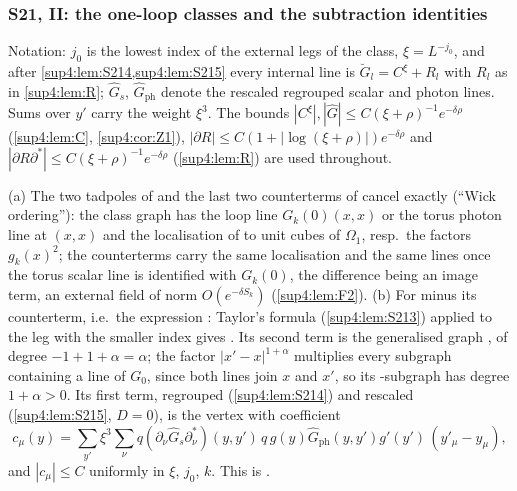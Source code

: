 
\subsubsection{S21, II: the one-loop classes and the subtraction identities}\label{sup4:ssec:S21b}

Notation: $j_0$ is the lowest index of the external legs of the class, $\xi=L^{-j_0}$, and after \cref{sup4:lem:S214,sup4:lem:S215} every internal line is $\breve G_l=C^\xi+R_l$ with $R_l$ as in \cref{sup4:lem:R}; $\hat G_s$, $\hat G_{\mathrm{ph}}$ denote the rescaled regrouped scalar and photon lines. Sums over $y'$ carry the weight $\xi^3$. The bounds $|C^\xi|,|\hat G|\le C(\xi+\rho)^{-1}e^{-\delta\rho}$ (\cref{sup4:lem:C}, \cref{sup4:cor:Z1}), $|\partial R|\le C(1+|\log(\xi+\rho)|)e^{-\delta\rho}$ and $|\partial R\partial^*|\le C(\xi+\rho)^{-1}e^{-\delta\rho}$ (\cref{sup4:lem:R}) are used throughout.

\begin{lemma}[{scalar self-energies with $D=-1$, \cite[(3.6)--(3.17)]{Ba3}}]\label{sup4:lem:S218}
\textup{(a)} The two tadpoles of \cite[(3.6)]{Ba3} and the last two counterterms of \cite[(3.7)]{Ba3} cancel exactly (``Wick ordering''): the class graph has the loop line $G_k(0)(x,x)$ or the torus photon line at $(x,x)$ and the localisation of \cite[(1.6)]{Ba3} to unit cubes of $\Omega_1$, resp.\ the factors $g_k(x)^2$; the counterterms \cite[(1.29)]{Ba3} carry the same localisation and the same lines once the torus scalar line is identified with $G_k(0)$, the difference being an image term, an external field of norm $O(e^{-\delta S_k})$ (\cref{sup4:lem:F2}). \textup{(b)} For \cite[(3.8)]{Ba3} minus its counterterm, i.e.\ the expression \cite[(3.9)]{Ba3}: Taylor's formula (\cref{sup4:lem:S213}) applied to the leg with the smaller index \cite[p.~435]{Ba3} gives \cite[(3.11)]{Ba3}. Its second term is the generalised graph \cite[(3.12)]{Ba3}, of degree $-1+1+\alpha=\alpha$; the factor $|x'-x|^{1+\alpha}$ multiplies every subgraph containing a line of $G_0$, since both lines join $x$ and $x'$, so its \cite[(2.4)]{Ba3}-subgraph has degree $1+\alpha>0$. Its first term, regrouped (\cref{sup4:lem:S214}) and rescaled (\cref{sup4:lem:S215}, $D=0$), is the vertex \cite[(3.15)]{Ba3} with coefficient
\[
c_\mu(y)=\sum_{y'}\xi^3\sum_\nu q(\partial_\nu\hat G_s\partial_\nu^*)(y,y')\,q\,g(y)\hat G_{\mathrm{ph}}(y,y')g'(y')\,(y'_\mu-y_\mu),
\]
and $|c_\mu|\le C$ uniformly in $\xi$, $j_0$, $k$. This is \cite[(3.17)]{Ba3}.
\end{lemma}

